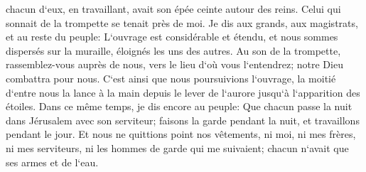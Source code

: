 \verse chacun d`eux, en travaillant, avait son épée ceinte autour des reins. Celui qui sonnait de la trompette se tenait près de moi. 
\verse Je dis aux grands, aux magistrats, et au reste du peuple: L`ouvrage est considérable et étendu, et nous sommes dispersés sur la muraille, éloignés les uns des autres. 
\verse Au son de la trompette, rassemblez-vous auprès de nous, vers le lieu d`où vous l`entendrez; notre Dieu combattra pour nous. 
\verse C`est ainsi que nous poursuivions l`ouvrage, la moitié d`entre nous la lance à la main depuis le lever de l`aurore jusqu`à l`apparition des étoiles. 
\verse Dans ce même temps, je dis encore au peuple: Que chacun passe la nuit dans Jérusalem avec son serviteur; faisons la garde pendant la nuit, et travaillons pendant le jour. 
\verse Et nous ne quittions point nos vêtements, ni moi, ni mes frères, ni mes serviteurs, ni les hommes de garde qui me suivaient; chacun n`avait que ses armes et de l`eau. 

\chapter{}

